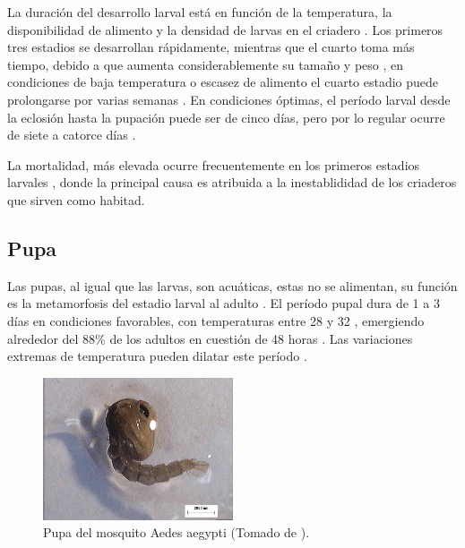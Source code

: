 La duración del desarrollo larval está en función de la temperatura, la disponibilidad de alimento
y la densidad de larvas en el criadero \cite{ThironIzcazaJ2003}. Los primeros tres estadios se
desarrollan rápidamente, mientras que el cuarto toma más tiempo, debido a que aumenta
considerablemente su tamaño y peso \cite{ThironIzcazaJ2003, web-site:gMonteroBiologia},
en condiciones de baja temperatura o escasez de alimento el cuarto estadio puede prolongarse por
varias semanas \cite{ThironIzcazaJ2003}. En condiciones óptimas, el período larval desde la
eclosión hasta la pupación puede ser de cinco días, pero por lo regular ocurre de siete a catorce
días \cite{ThironIzcazaJ2003}.

La mortalidad, más elevada ocurre frecuentemente en los primeros estadios larvales
\cite{ThironIzcazaJ2003}, donde la principal causa es atribuida a la inestablididad de los
criaderos que sirven como habitad.

\subsection{Pupa}
\label{subsec:ciclo-biologico-pupa}
Las pupas, al igual que las larvas, son acuáticas, estas no se alimentan, su función es la
metamorfosis del estadio larval al adulto \cite{ThironIzcazaJ2003}. El período pupal dura de 1
a 3 días en condiciones favorables, con temperaturas entre 28 y 32 \textcelsius
\cite{web-site:gMonteroBiologia}, emergiendo alrededor del 88\% de los adultos en cuestión de 48
horas \cite{ThironIzcazaJ2003}. Las variaciones extremas de temperatura pueden dilatar este período
\cite{web-site:gMonteroBiologia}.

\begin{figure}[!htbp]
\centering
\includegraphics[width=0.5\textwidth]{capitulo-3/graphics/pupa.png}
\caption{\label{fig:cap3-larvas} Pupa del mosquito Aedes aegypti (Tomado de
\cite{sivanathan2006ecology}).}
\end{figure}

